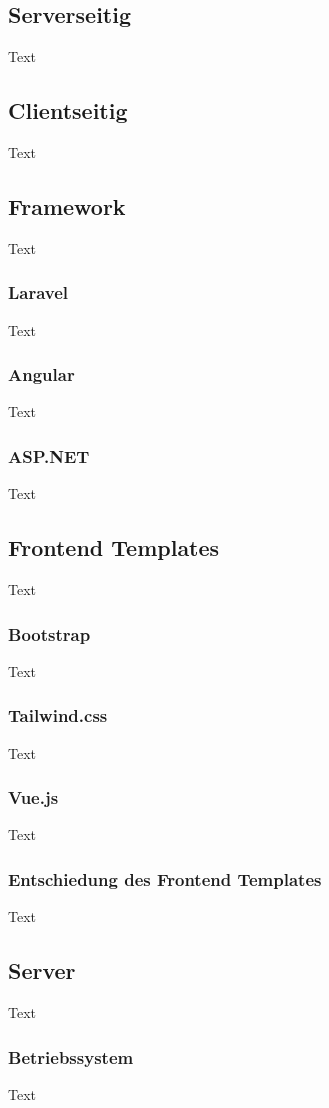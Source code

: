 \subsection{Serverseitig }
Text

\subsection{Clientseitig }
Text

\subsection{Framework }
Text
\subsubsection{Laravel}
Text
\subsubsection{Angular}
Text
\subsubsection{ASP.NET}
Text

\subsection{Frontend Templates}
Text
\subsubsection{Bootstrap}
Text
\subsubsection{Tailwind.css}
Text
\subsubsection{Vue.js}
Text
\subsubsection{Entschiedung des Frontend Templates}
Text

\subsection{Server}
Text
\subsubsection{Betriebssystem}
Text
